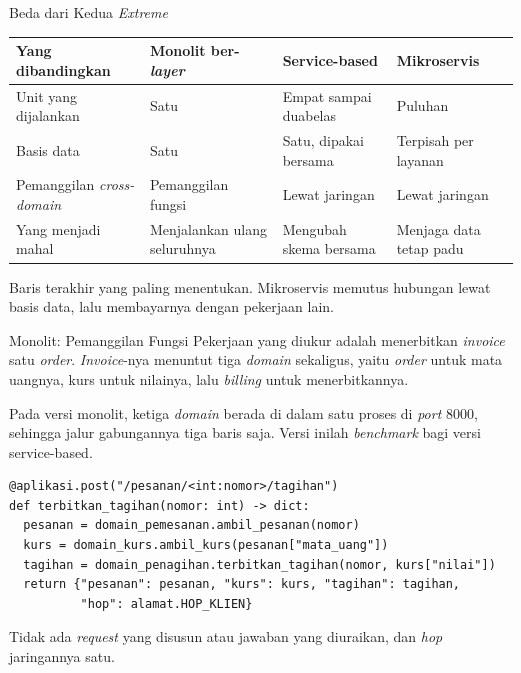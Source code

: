 \documentclass[aspectratio=169, table, 12pt]{beamer}
\begin{document}
\begin{frame}{{\Large Beda dari Kedua \textit{Extreme}}}
  \vspace{18pt}
  \centering
  \footnotesize
  \begin{tabularx}{0.92\textwidth}{|l|>{\raggedright\arraybackslash}X|>{\raggedright\arraybackslash}X|>{\raggedright\arraybackslash}X|}
    \hline
    \textbf{Yang dibandingkan} & \textbf{Monolit ber-\textit{layer}} & \textbf{Service-based} & \textbf{Mikroservis} \\
    \hline
    Unit yang dijalankan & Satu & Empat sampai duabelas & Puluhan \\
    \hline
    Basis data & Satu & Satu, dipakai bersama & Terpisah per layanan \\
    \hline
    Pemanggilan \textit{cross-domain} & Pemanggilan fungsi & Lewat jaringan & Lewat jaringan \\
    \hline
    Yang menjadi mahal & Menjalankan ulang seluruhnya & Mengubah skema bersama & Menjaga data tetap padu \\
    \hline
  \end{tabularx}

  \vspace{8pt}
  {\small Baris terakhir yang paling menentukan. Mikroservis memutus hubungan
  lewat basis data, lalu membayarnya dengan pekerjaan lain.}
\end{frame}

\begin{frame}[fragile]{{\Large Monolit: Pemanggilan Fungsi}}
  \vspace{20pt}
  {\small Pekerjaan yang diukur adalah menerbitkan \textit{invoice} satu \textit{order}.
  \textit{Invoice}-nya menuntut tiga \textit{domain} sekaligus, yaitu \textit{order} untuk mata
  uangnya, kurs untuk nilainya, lalu \textit{billing} untuk menerbitkannya.}

  \vspace{3pt}
  {\small Pada versi monolit, ketiga \textit{domain} berada di dalam satu proses
  di \textit{port} 8000, sehingga jalur gabungannya tiga baris saja. Versi inilah
  \textit{benchmark} bagi versi service-based.}
  \vspace{2pt}
\begin{lstlisting}[style=PythonStyle]
@aplikasi.post("/pesanan/<int:nomor>/tagihan")
def terbitkan_tagihan(nomor: int) -> dict:
  pesanan = domain_pemesanan.ambil_pesanan(nomor)
  kurs = domain_kurs.ambil_kurs(pesanan["mata_uang"])
  tagihan = domain_penagihan.terbitkan_tagihan(nomor, kurs["nilai"])
  return {"pesanan": pesanan, "kurs": kurs, "tagihan": tagihan,
          "hop": alamat.HOP_KLIEN}
\end{lstlisting}
  \vspace{2pt}
  {\small Tidak ada \textit{request} yang disusun atau jawaban yang diuraikan,
  dan \textit{hop} jaringannya satu.}
\end{frame}
\end{document}

